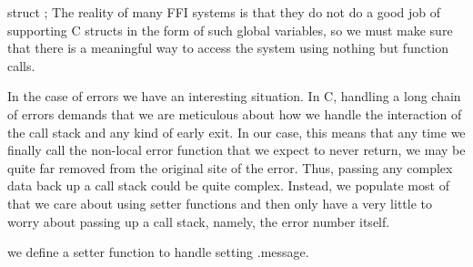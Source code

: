 \documentclass{article}%
\begin{document}
\nwenddocs{}\endmoddef\nwstartdeflinemarkup{}\nwenddeflinemarkup
struct  ;
\eatline
{}\nwendcode{}\nwdocspar
The reality of many FFI systems is that they
do not do a good job of supporting C structs in the form
of such global variables,
so we must make sure 
that there is a meaningful way to access
the system using nothing but function calls.

In the case of errors we have an interesting situation.
In C, handling a long chain of errors demands that we are meticulous
about how we handle the interaction of the call stack and
any kind of early exit.
In our case, this means 
that any time we finally call the non-local error function
that we expect to never return,
we may be quite far removed from the original site of the error.
Thus, passing any complex data back up a call stack
could be quite complex.
Instead, we populate most of {\Tt{}\nwendquote} 
that we care about using setter functions
and then only have a very little to worry about passing
up a call stack,
namely, the error number itself.

we define a setter function {\Tt{}\nwendquote}
to handle setting {\Tt{}.message\nwendquote}.
\end{document}
